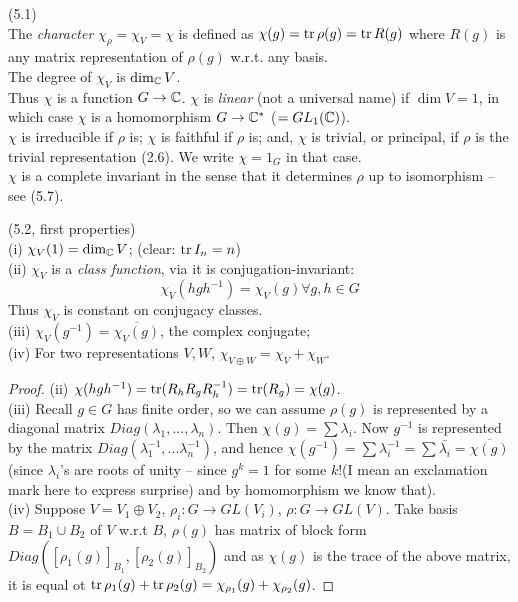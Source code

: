 \documentclass[a4paper]{article}
\begin{document}
\begin{defi} (5.1)\\
The \emph{character} $\chi_\rho = \chi_V = \chi$ is defined as $\chi(g) = \operatorname{tr} \rho(g) = \operatorname{tr} R(g)$ where $R(g)$ is any matrix representation of $\rho(g)$ w.r.t. any basis.\\
The degree of $\chi_V$ is $\dim_{\mathbb{C}} V$.\\
Thus $\chi$ is a function $G \to \mathbb{C}$. $\chi$ is \emph{linear} (not a universal name) if $\dim V=1$, in which case $\chi$ is a homomorphism $G \to \mathbb{C}^*$ ($=GL_1(\mathbb{C})$).\\
$\chi$ is irreducible if $\rho$ is; $\chi$ is faithful if $\rho$ is; and, $\chi$ is trivial, or principal, if $\rho$ is the trivial representation (2.6). We write $\chi = 1_G$ in that case.\\
$\chi$ is a complete invariant in the sense that it determines $\rho$ up to isomorphism -- see (5.7).
\end{defi}

\begin{thm} (5.2, first properties)\\
(i) $\chi_V(1) = \dim_{\mathbb{C}} V$; (clear: $\operatorname{tr} I_n = n$)\\
(ii) $\chi_V$ is a \emph{class function}, via it is conjugation-invariant: $$\chi_V (hgh^{-1}) = \chi_V(g) \forall g,h \in G$$
Thus $\chi_V$ is constant on conjugacy classes.\\
(iii) $\chi_V(g^{-1}) = \overline{\chi_V(g)}$, the complex conjugate;\\
(iv) For two representations $V,W$, $\chi_{V \oplus W} = \chi_V + \chi_W$.
\begin{proof}
(ii) $\chi(hgh^{-1}) = \operatorname{tr} (R_h R_g R^{-1}_h) = \operatorname{tr} (R_g) = \chi(g)$.\\
(iii) Recall $g \in G$ has finite order, so we can assume $\rho(g)$ is represented by a diagonal matrix $Diag(\lambda_1,...,\lambda_n)$. Then $\chi(g) = \sum \lambda_i$. Now $g^{-1}$ is represented by the matrix $Diag(\lambda_1^{-1},...\lambda_n^{-1})$, and hence $\chi(g^{-1}) = \sum \lambda_i^{-1} = \sum \bar{\lambda_i} = \overline{\chi(g)}$ (since $\lambda_i$'s are roots of unity -- since $g^k = 1$ for some $k$!(I mean an exclamation mark here to express surprise) and by homomorphism we know that).\\
(iv) Suppose $V = V_1 \oplus V_2$, $\rho_i : G \to GL(V_i)$, $\rho:G \to GL(V)$. Take basis $B = B_1 \cup B_2$ of $V$ w.r.t $B$, $\rho(g)$ has matrix of block form $Diag([\rho_1(g)]_{B_1},[\rho_2(g)]_{B_2})$ and as $\chi(g)$ is the trace of the above matrix, it is equal ot $\operatorname{tr} \rho_1(g)+ \operatorname{tr}\rho_2(g) = \chi_{\rho_1} (g) + \chi_{\rho_2}(g)$.
\end{proof}
\end{thm}
\end{document}
